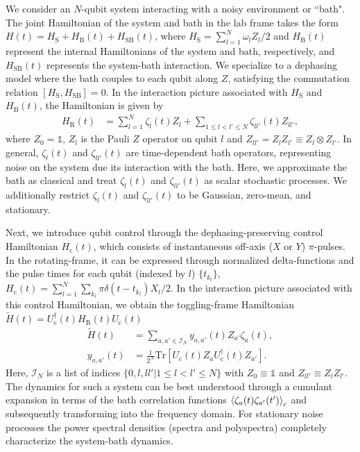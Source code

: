 \documentclass[%
 reprint,
superscriptaddress,
 amsmath,amssymb,
 aps,
pra,
]{revtex4-2}
\begin{document}
We consider an $N$-qubit system interacting with a noisy environment or ``bath". The joint Hamiltonian of the system and bath in the lab frame takes the form $H(t)=H_\text{S}+H_\text{B}(t)+H_\text{SB}(t)$, where $H_\text{S}=\sum_{l=1}^N\omega_l Z_l/2$ and $H_\text{B}(t)$ represent the internal Hamiltonians of the system and bath, respectively, and $H_\text{SB}(t)$ represents the system-bath interaction. We specialize to a dephasing model where the bath couples to each qubit along $Z$, satisfying the commutation relation $[H_\text{S},H_\text{SB}]=0$. In the interaction picture associated with $H_\text{S}$ and $H_\text{B}(t)$, the Hamiltonian is given by
\begin{align}
    H_\text{R}(t)&=\sum_{l=1}^N \zeta_l(t) Z_l + \sum_{1\leq l <l'\leq N} \zeta_{ll'}(t) Z_{ll'},
\end{align}
where $Z_0=\mathbb{1}$, $Z_l$ is the Pauli $Z$ operator on qubit $l$ and $Z_{ll'}=Z_lZ_{l'}\equiv Z_l\otimes Z_{l'}$.
In general, $\zeta_l(t)$ and $\zeta_{ll'}(t)$ are time-dependent bath operators, representing noise on the system due its interaction with the bath. Here, we approximate the bath as classical and treat $\zeta_l(t)$ and $\zeta_{ll'}(t)$ as scalar stochastic processes. We additionally restrict $\zeta_l(t)$ and $\zeta_{ll'}(t)$ to be Gaussian, zero-mean, and stationary.

Next, we introduce qubit control through the dephasing-preserving control Hamiltonian $H_\text{c}(t)$, which consists of instantaneous off-axis ($X$ or $Y$) $\pi$-pulses. In the rotating-frame, it can be expressed through normalized delta-functions and the pulse times for each qubit (indexed by $l$) $\{t_{k_l}\}$, $H_\text{c}(t)=\sum_{l=1}^N\sum_{k_l} \pi\delta(t-t_{k_l})X_l/2$. In the interaction picture associated with this control Hamiltonian, we obtain the toggling-frame Hamiltonian $\tilde{H}(t)=U_\text{c}^\dagger(t)H_\text{R}(t)U_\text{c}(t)$
\begin{align}
    \tilde{H}(t)&=\sum_{a,a'\in \mathcal{I}_N}y_{a,a'}(t)Z_{a'}\zeta_{a}(t) ,\\
    y_{a,a'}(t)&=\frac{1}{2^N}\text{Tr}\left[U_\text{c}(t)Z_a U_\text{c}^\dagger(t)Z_{a'}\right].
\end{align}
Here, $\mathcal{I}_N$ is a list of indices $\{0, l, ll'|1\leq l<l'\leq N\}$ with $Z_0\equiv\mathbb{1}$ and $Z_{ll'}\equiv Z_{l}Z_{l'}$. 
The dynamics for such a system can be best understood through a cumulant expansion in terms of the bath correlation functions $\braket{\zeta_{a}(t)\zeta_{a'}(t')}_c$ and subsequently transforming into the frequency domain. For stationary noise processes the power spectral densities (spectra and polyspectra) completely characterize the system-bath dynamics.
\end{document}
